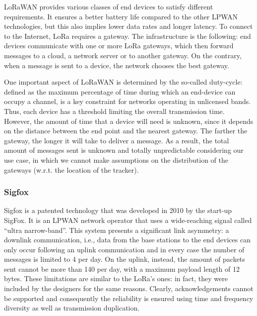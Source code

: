 LoRaWAN provides various classes of end devices to satisfy different requirements. It ensures a better battery life compared to the other LPWAN technologies, but this also implies lower data rates and longer latency. To connect to the Internet, LoRa requires a gateway. The infrastructure is the following: end devices communicate with one or more LoRa gateways, which then forward messages to a cloud, a network server or to another gateway. On the contrary, when a message is sent to a device, the network chooses the best gateway.

One important aspect of LoRaWAN is determined by the so-called duty-cycle: defined as the maximum percentage of time during which an end-device can occupy a channel, is a key constraint for networks operating in unlicensed bands. Thus, each device has a threshold limiting the overall transmission time. However, the amount of time that a device will need is unknown, since it depends on the distance between the end point and the nearest gateway. The farther the gateway, the longer it will take to deliver a message. As a result, the total amount of messages sent is unknown and totally unpredictable considering our use case, in which we cannot make assumptions on the distribution of the gateways (w.r.t. the location of the tracker).


\subsubsection{Sigfox}
Sigfox is a patented technology that was developed in 2010 by the start-up SigFox. It is an LPWAN network operator that uses a wide-reaching signal called ``ultra narrow-band''. This system presents a significant link asymmetry: a downlink communication, i.e., data from the base stations to the end devices can only occur following an uplink communication and in every case the number of messages is limited to 4 per day. On the uplink, instead, the amount of packets sent cannot be more than 140 per day, with a maximum payload length of 12 bytes. These limitations are similar to the LoRa's ones: in fact, they were included by the designers for the same reasons. Clearly, acknowledgements cannot be supported and consequently the reliability is ensured using time and frequency diversity as well as transmission duplication.

